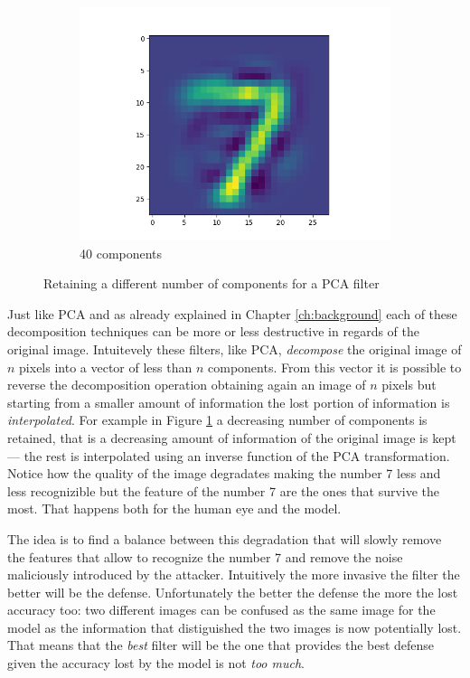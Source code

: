 \begin{figure}
\begin{subfigure}{0.3\linewidth}
    \includegraphics[width=\linewidth]{Images/filtered-input-pca-40-components.png}
    \caption{40 components}
  \end{subfigure}
  \caption{Retaining a different number of components for a PCA filter}
  \label{fig:various-pca-reductions}
\end{figure}

Just like PCA and as already explained in Chapter \ref{ch:background}
each of these decomposition techniques can be more or less destructive
in regards of the original image. Intuitevely these filters, like PCA,
\emph{decompose} the original image of $n$ pixels into a vector of less
than $n$ components. From this vector it is possible to reverse the
decomposition operation obtaining again an image of $n$ pixels but
starting from a smaller amount of information the lost portion of
information is \emph{interpolated}. For example in Figure
\ref{fig:various-pca-reductions} a decreasing number of components is
retained, that is a decreasing amount of information of the original
image is kept --- the rest is interpolated using an inverse function of
the PCA transformation. Notice how the quality of the image degradates
making the number 7 less and less recognizible but the feature of the
number 7 are the ones that survive the most. That happens both for the
human eye and the model.

The idea is to find a balance between this degradation that will slowly
remove the features that allow to recognize the number 7 and remove the
noise maliciously introduced by the attacker. Intuitively the more
invasive the filter the better will be the defense. Unfortunately the
better the defense the more the lost accuracy too: two different images
can be confused as the same image for the model as the information that
distiguished the two images is now potentially lost. That means that
the \emph{best} filter will be the one that provides the best defense
given the accuracy lost by the model is not \emph{too much}.

